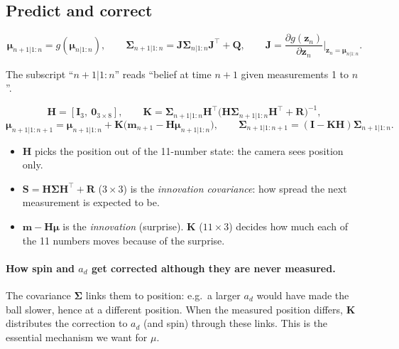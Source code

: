 \documentclass[11pt,a4paper]{article}
\newcommand{\zz}{\mathbf{z}}
\newcommand{\mm}{\mathbf{m}}
\newcommand{\mmu}{\boldsymbol{\mu}}
\newcommand{\SSigma}{\boldsymbol{\Sigma}}
\begin{document}
\subsection{Predict and correct}
\begin{eqbox}
\[
\mmu_{n+1|1:n}=g(\mmu_{n|1:n}),\qquad\SSigma_{n+1|1:n}=\mathbf J\SSigma_{n|1:n}\mathbf J^\top+\mathbf Q,\qquad\mathbf J=\frac{\partial g(\zz_n)}{\partial\zz_n}\Big|_{\zz_n=\mmu_{n|1:n}} .
\]
\end{eqbox}
The subscript ``$n+1|1:n$'' reads ``belief at time $n+1$ given measurements 1 to $n$''.
\begin{eqbox}
\[
\mathbf H=[\mathbf I_3,\ \mathbf 0_{3\times8}],\qquad\mathbf K=\SSigma_{n+1|1:n}\mathbf H^\top\big(\mathbf H\SSigma_{n+1|1:n}\mathbf H^\top+\mathbf R\big)^{-1},
\]
\[
\mmu_{n+1|1:n+1}=\mmu_{n+1|1:n}+\mathbf K\big(\mm_{n+1}-\mathbf H\mmu_{n+1|1:n}\big),\qquad\SSigma_{n+1|1:n+1}=(\mathbf I-\mathbf K\mathbf H)\SSigma_{n+1|1:n}.
\]
\end{eqbox}
\begin{itemize}
\item $\mathbf H$ picks the position out of the 11-number state: the camera sees position only.
\item $\mathbf S=\mathbf H\SSigma\mathbf H^\top+\mathbf R$ ($3\times3$) is the \emph{innovation covariance}: how spread the next measurement is expected to be.
\item $\mm-\mathbf H\mmu$ is the \emph{innovation} (surprise). $\mathbf K$ ($11\times3$) decides how much each of the 11 numbers moves because of the surprise.
\end{itemize}
\paragraph{How spin and $a_d$ get corrected although they are never measured.} The covariance $\SSigma$ links them to position: e.g.\ a larger $a_d$ would have made the ball slower, hence at a different position.
When the measured position differs, $\mathbf K$ distributes the correction to $a_d$ (and spin) through these links. This is the essential mechanism we want for $\mu$.
\end{document}
